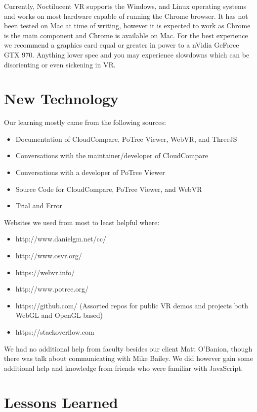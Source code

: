 \documentclass[draftclsnofoot,onecolumn]{IEEEtran}
\begin{document}
Currently, Noctilucent VR supports the Windows, and Linux operating systems and works on most hardware capable of running the Chrome browser. It has not been tested on Mac at time of writing, however it is expected to work as Chrome is the main component and Chrome is available on Mac.
For the best experience we recommend a graphics card equal or greater in power to a nVidia GeForce GTX 970. 
Anything lower spec and you may experience slowdowns which can be disorienting or even sickening in VR.

\section{New Technology}

Our learning mostly came from the following sources:
\begin{itemize}
  \item Documentation of CloudCompare, PoTree Viewer, WebVR, and ThreeJS
  \item Conversations with the maintainer/developer of CloudCompare
  \item Conversations with a developer of PoTree Viewer
  \item Source Code for CloudCompare, PoTree Viewer, and WebVR
  \item Trial and Error
\end{itemize}

Websites we used from most to least helpful where:
\begin{itemize}
  \item http://www.danielgm.net/cc/
  \item http://www.osvr.org/
  \item https://webvr.info/
  \item http://www.potree.org/
  \item https://github.com/ (Assorted repos for public VR demos and projects both WebGL and OpenGL based)
  \item https://stackoverflow.com
\end{itemize}
We had no additional help from faculty besides our client Matt O'Banion, though there was talk about communicating with Mike Bailey.
We did however gain some additional help and knowledge from friends who were familiar with JavaScript.

\section{Lessons Learned}
\end{document}
